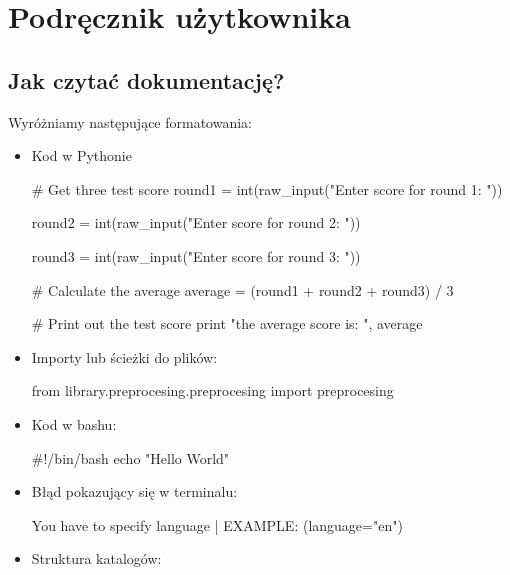 \newpage
\section{Podręcznik użytkownika}
\subsection{Jak czytać dokumentację?}

Wyróżniamy następujące formatowania:

\begin{itemize}
\item Kod w Pythonie

\begin{python}
# Get three test score
round1 = int(raw_input("Enter score for round 1: "))

round2 = int(raw_input("Enter score for round 2: "))

round3 = int(raw_input("Enter score for round 3: "))
   
# Calculate the average
average = (round1 + round2 + round3) / 3

# Print out the test score
print "the average score is: ", average 

\end{python}
 
\item Importy lub ścieżki do plików:
\begin{import}
from library.preprocesing.preprocesing import preprocesing
\end{import}

\item Kod w bashu:

\begin{bash}
#!/bin/bash
echo "Hello World"
\end{bash}

\item Błąd pokazujący się w terminalu:
\begin{consolerror}
You have to specify language | EXAMPLE: (language="en")
\end{consolerror}



\item Struktura katalogów:
\myspace
{}

\end{itemize}